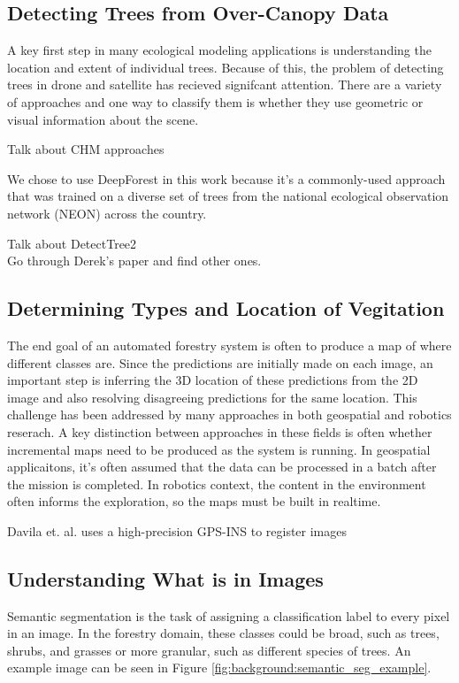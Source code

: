 \subsection{Detecting Trees from Over-Canopy Data}
A key first step in many ecological modeling applications is understanding the location and extent of individual trees. Because of this, the problem of detecting trees in drone and satellite has recieved signifcant attention. There are a variety of approaches and one way to classify them is whether they use geometric or visual information about the scene. 

Talk about CHM approaches

We chose to use DeepForest \cite{Weinstein2020DeepForest:Delineation} in this work because it's a commonly-used approach that was trained on a diverse set of trees from the national ecological observation network (NEON) \cite{Keller2008ANetwork} across the country.

Talk about DetectTree2 \cite{DetectTree2} \\
Go through Derek's paper and find other ones.


\subsection{Determining Types and Location of Vegitation}
The end goal of an automated forestry system is often to produce a map of where different classes are. Since the predictions are initially made on each image, an important step is inferring the 3D location of these predictions from the 2D image and also resolving disagreeing predictions for the same location. This challenge has been addressed by many approaches in both geospatial and robotics reserach. A key distinction between approaches in these fields is often whether incremental maps need to be produced as the system is running. In geospatial applicaitons, it's often assumed that the data can be processed in a batch after the mission is completed. In robotics context, the content in the environment often informs the exploration, so the maps must be built in realtime. 

Davila et. al. uses a high-precision GPS-INS to register images \cite{Davila2022ADAPT:AI}


\subsection{Understanding What is in Images}
Semantic segmentation is the task of assigning a classification label to every pixel in an image. In the forestry domain, these classes could be broad, such as trees, shrubs, and grasses or more granular, such as different species of trees. An example image can be seen in Figure \ref{fig:background:semantic_seg_example}.


